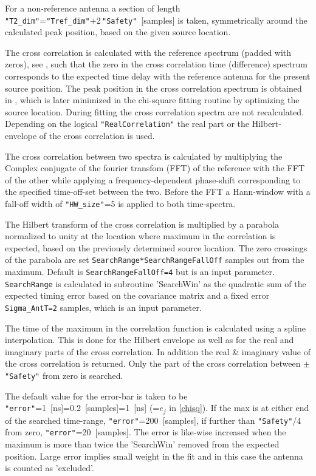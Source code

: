 For a non-reference antenna a section of length \verb!"T2_dim"!=\verb!"Tref_dim"!+2\,\verb!"Safety"!~[samples] is taken, symmetrically around the calculated peak position, based on the given source location.

The cross correlation is calculated with the reference spectrum (padded with zeros), see , such that the zero in the cross correlation time (difference) spectrum corresponds to the expected time delay with the reference antenna for the present source position. The peak position in the cross correlation spectrum is obtained in , which is later minimized in the chi-square fitting routine by optimizing the source location. During fitting the cross correlation spectra are not recalculated. Depending on the logical \verb!"RealCorrelation"! the real part or the Hilbert-envelope of the cross correlation is used.

The cross correlation between two spectra is calculated by multiplying the Complex conjugate of the fourier transfom (FFT) of the reference with the FFT of the other while applying a frequency-dependent phase-shift corresponding to the specified time-off-set between the two. Before the FFT a Hann-window with a fall-off width of \verb!"HW_size"!=5 is applied to both time-spectra.

The Hilbert transform of the cross correlation is multiplied by a parabola normalized to unity at the location where maximum in the correlation is expected, based on the previously determined source location. The zero crossings of the parabola are set \verb!SearchRange*SearchRangeFallOff! samples out from the maximum. Default is \verb!SearchRangeFallOff=4! but is an input parameter. \verb!SearchRange! is calculated in subroutine 'SearchWin' as the quadratic sum of the expected timing error based on the covariance matrix and a fixed error \verb!Sigma_AntT=2! samples, which is an input parameter.

The time of the maximum in the correlation function is calculated using a spline interpolation. This is done for the Hilbert envelope as well as for the real and imaginary parts of the cross correlation. In addition the real \& imaginary value of the cross correlation is returned.  Only the part of the cross correlation between $\pm$\verb!"Safety"! from zero is searched.

The default value for the error-bar is taken to be \verb!"error"!=1~[ns]=0.2~[samples]=1~[ns] (=$e_j$ in \eqref{chisq}). If the max is at either end of the searched time-range, \verb!"error"!=200~[samples], if further than \verb!"Safety"!/4 from zero, \verb!"error"!=20~[samples]. The error is like-wise increased when the maximum is more than twice the 'SearchWin' removed from the expected position. Large error implies small weight in the fit and in this case the antenna is counted as 'excluded'.

